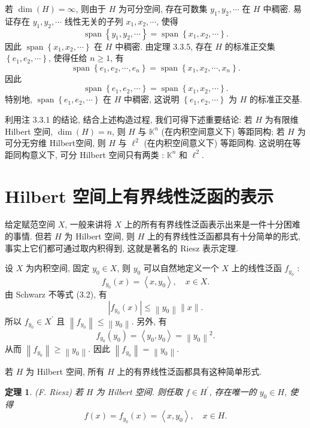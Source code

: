 \documentclass[openany]{ctexbook}
\theoremstyle{kaiti}
\newtheorem{theorem}{定理}[section]
\theoremstyle{normal}
\begin{document}
若 $\operatorname{dim}(H)=\infty$, 则由于 $H$ 为可分空间, 存在可数集 $y_1, y_2, \cdots$ 在 $H$ 中稠密. 易证存在 $y_1, y_2, \cdots$ 线性无关的子列 $x_1, x_2, \cdots$, 使得
$$
\operatorname{span}\left\{y_1, y_2, \cdots\right\}=\operatorname{span}\left\{x_1, x_2, \cdots\right\}.
$$
因此 $\operatorname{span}\left\{x_1, x_2, \cdots\right\}$ 在 $H$ 中稠密. 由定理 3.3.5, 存在 $H$ 的标准正交集 $\left\{e_1, e_2, \cdots\right\}$, 使得任给 $n \geqslant 1$, 有
$$
\operatorname{span}\left\{e_1, e_2, \cdots, e_n\right\}=\operatorname{span}\left\{x_1, x_2, \cdots, x_n\right\}.
$$
因此
$$
\operatorname{span}\left\{e_1, e_2, \cdots\right\}=\operatorname{span}\left\{x_1, x_2, \cdots\right\}.
$$
特别地, $\operatorname{span}\left\{e_1, e_2, \cdots\right\}$ 在 $H$ 中稠密, 这说明 $\left\{e_1, e_2, \cdots\right\}$ 为 $H$ 的标准正交基.

利用注 3.3.1 的结论, 结合上述构造过程, 我们可得下述重要结论: 若 $H$ 为有限维 Hilbert 空间, $\operatorname{dim}(H)=n$, 则 $H$ 与 $\mathbb{K}^n$ (在内积空间意义下) 等距同构; 若 $H$ 为可分无穷维 Hilbert空间, 则 $H$ 与 $\ell^2$ (在内积空间意义下) 等距同构. 这说明在等距同构意义下, 可分 Hilbert 空间只有两类 : $\mathbb{K}^n$ 和 $\ell^2$.

\section{Hilbert 空间上有界线性泛函的表示}

给定赋范空间 $X$, 一般来讲将 $X$ 上的所有有界线性泛函表示出来是一件十分困难的事情. 但若 $H$ 为 Hilbert 空间, 则 $H$ 上的有界线性泛函都具有十分简单的形式, 事实上它们都可通过取内积得到, 这就是著名的 Riesz 表示定理.

设 $X$ 为内积空间, 固定 $y_0 \in X$, 则 $y_0$ 可以自然地定义一个 $X$ 上的线性泛函 $f_{y_0}$ :
$$
f_{y_0}(x)=\left\langle x, y_0\right\rangle, \quad x \in X.
$$
由 Schwarz 不等式 (3.2), 有
$$
\left|f_{y_0}(x)\right| \leqslant\left\|y_0\right\|\|x\|.
$$
所以 $f_{y_0} \in X^{\prime}$ 且 $\left\|f_{y_0}\right\| \leqslant\left\|y_0\right\|$. 另外, 有
$$
f_{y_0}\left(y_0\right)=\left\langle y_0, y_0\right\rangle=\left\|y_0\right\|^2.
$$
从而 $\left\|f_{y_0}\right\| \geqslant\left\|y_0\right\|$. 因此 $\left\|f_{y_0}\right\|=\left\|y_0\right\|$.

若 $H$ 为 Hilbert 空间, 所有 $H$ 上的有界线性泛函都具有这种简单形式.

\begin{theorem}
(F. Riesz) 若 $H$ 为 Hilbert 空间. 则任取 $f \in H^{\prime}$, 存在唯一的 $y_0 \in H$, 使得
$$
f(x)=f_{y_0}(x)=\left\langle x, y_0\right\rangle, \quad x \in H.
$$
\end{theorem}
\end{document}
